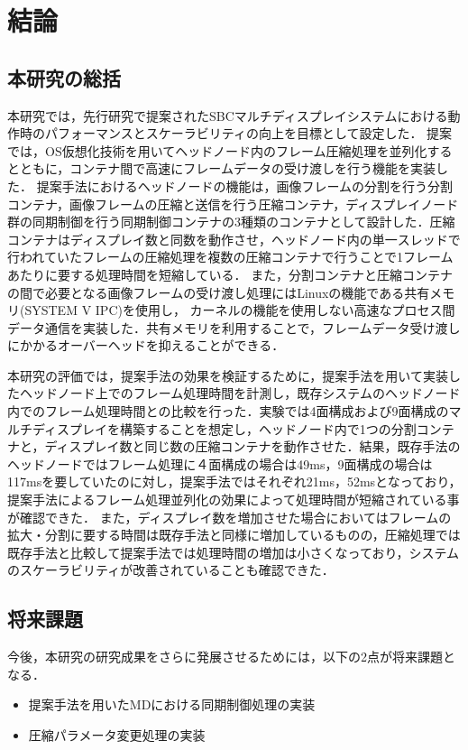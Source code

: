 \chapter{結論}

\section{本研究の総括}
本研究では，先行研究で提案されたSBCマルチディスプレイシステムにおける動作時のパフォーマンスとスケーラビリティの向上を目標として設定した．
提案では，OS仮想化技術を用いてヘッドノード内のフレーム圧縮処理を並列化するとともに，コンテナ間で高速にフレームデータの受け渡しを行う機能を実装した．
提案手法におけるヘッドノードの機能は，画像フレームの分割を行う分割コンテナ，画像フレームの圧縮と送信を行う圧縮コンテナ，ディスプレイノード群の同期制御を行う同期制御コンテナの3種類のコンテナとして設計した．圧縮コンテナはディスプレイ数と同数を動作させ，ヘッドノード内の単一スレッドで行われていたフレームの圧縮処理を複数の圧縮コンテナで行うことで1フレームあたりに要する処理時間を短縮している．
また，分割コンテナと圧縮コンテナの間で必要となる画像フレームの受け渡し処理にはLinuxの機能である共有メモリ(SYSTEM V IPC)を使用し，
カーネルの機能を使用しない高速なプロセス間データ通信を実装した．共有メモリを利用することで，フレームデータ受け渡しにかかるオーバーヘッドを抑えることができる．



本研究の評価では，提案手法の効果を検証するために，提案手法を用いて実装したヘッドノード上でのフレーム処理時間を計測し，既存システムのヘッドノード内でのフレーム処理時間との比較を行った．実験では4面構成および9面構成のマルチディスプレイを構築することを想定し，ヘッドノード内で1つの分割コンテナと，ディスプレイ数と同じ数の圧縮コンテナを動作させた．結果，既存手法のヘッドノードではフレーム処理に４面構成の場合は49ms，9面構成の場合は117msを要していたのに対し，提案手法ではそれぞれ21ms，52msとなっており，提案手法によるフレーム処理並列化の効果によって処理時間が短縮されている事が確認できた．
また，ディスプレイ数を増加させた場合においてはフレームの拡大・分割に要する時間は既存手法と同様に増加しているものの，圧縮処理では既存手法と比較して提案手法では処理時間の増加は小さくなっており，システムのスケーラビリティが改善されていることも確認できた．

\section{将来課題}
今後，本研究の研究成果をさらに発展させるためには，以下の2点が将来課題となる．
\begin{itemize}
    \item 提案手法を用いたMDにおける同期制御処理の実装
    \item 圧縮パラメータ変更処理の実装
\end{itemize}

